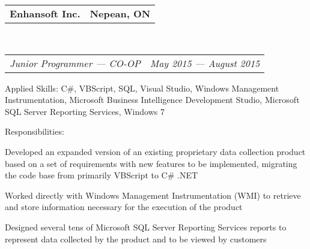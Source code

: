\documentclass[10pt,letterpaper]{article}
\makeatletter
\newenvironment{indentsection}[1]%
{\begin{list}{}%
  {\setlength{\leftmargin}{#1}}%
  \item[]%
}
{\end{list}}
\newcommand{\headerrow}[2]
{\begin{tabular*}{\linewidth}{l@{\extracolsep{\fill}}r}
  #1 &
  #2 \\
\end{tabular*}}
\makeatother
\begin{document}
\begin{itemize}
  \item
  \headerrow
    {\textbf{Enhansoft Inc.}}
    {\textbf{Nepean, ON}}
  \\
  \headerrow
    {\emph{Junior Programmer — CO-OP}}
    {\emph{May 2015 — August 2015}}
  \begin{indentsection}{1em}
    \begin{description*}
      \item[Applied Skills:]
      C\#, VBScript, SQL, Visual Studio, Windows Management Instrumentation,
      Microsoft Business Intelligence Development Studio, Microsoft SQL Server
      Reporting Services, Windows 7
      \item[Responsibilities:]
      \hfill
      \begin{itemize*}
        \item Developed an expanded version of an existing proprietary data
        collection product based on a set of requirements with new features to be
        implemented, migrating the code base from primarily VBScript to C\# .NET
        \item Worked directly with Windows Management Instrumentation (WMI) to
        retrieve and store information necessary for the execution of the product
        \item Designed several tens of Microsoft SQL Server Reporting Services
        reports to represent data collected by the product and to be viewed by
        customers
      \end{itemize*}
    \end{description*}
  \end{indentsection}


\end{itemize}
\end{document}
